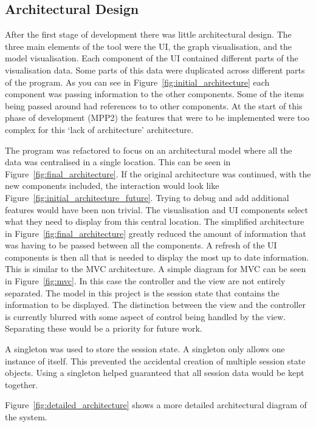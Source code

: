 \subsection{Architectural Design}
\label{sec:architecture}
After the first stage of development there was little architectural design.  The three main elements of the tool were the \ac{UI}, the graph visualisation, and the model visualisation.  Each component of the \ac{UI} contained different parts of the visualisation data.  Some parts of this data were duplicated across different parts of the program.   As you can see in Figure~\ref{fig:initial_architecture} each component was passing information to the other components.  Some of the items being passed around had references to to other components.  At the start of this phase of development (MPP2) the features that were to be implemented were too complex for this `lack of architecture' architecture.

The program was refactored to focus on an architectural model where all the data was centralised in a single location.  This can be seen in Figure~\ref{fig:final_architecture}.  If the original architecture was continued, with the new components included, the interaction would look like Figure~\ref{fig:initial_architecture_future}.  Trying to debug and add additional features would have been non trivial.  The visualisation and \ac{UI} components select what they need to display from this central location.  The simplified architecture in Figure~\ref{fig:final_architecture} greatly reduced the amount of information that was having to be passed between all the components.  A refresh of the \ac{UI} components is then all that is needed to display the most up to date information.  This is similar to the \ac{MVC} architecture.  A simple diagram for \ac{MVC} can be seen in Figure~\ref{fig:mvc}.  In this case the controller and the view are not entirely separated.  The model in this project is the session state that contains the information to be displayed.  The distinction between the view and the controller is currently blurred with some aspect of control being handled by the view.  Separating these would be a priority for future work.

A singleton was used to store the session state.  A singleton only allows one instance of itself.  This prevented the accidental creation of multiple session state objects.  Using a singleton helped guaranteed that all session data would be kept together.

Figure~\ref{fig:detailed_architecture} shows a more detailed architectural diagram of the system.



